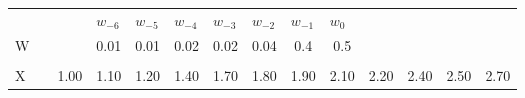 \begin{frame}
\begin{columns}
\begin{overlayarea}{\textwidth}{\textheight}
\begin{minipage}[t]{0.25\textwidth}
{\begin{table}[h]
{\begin{tabular}{p{0.1cm}p{0.1cm}p{0.1cm}p{0.1cm}p{0.1cm}p{0.1cm}p{0.1cm}p{0.1cm}p{0.1cm}p{0.1cm}p{0.1cm}p{0.1cm}p{0.1cm}p{0.1cm}}
								                     &                       &                           & $w_{-6}$                  & $w_{-5}$                  & $w_{-4}$                  & $w_{-3}$                  & $w_{-2}$                                         & $w_{-1}$                                         & $w_{0}$                                          &                                                  &                                                  &                                                  &                                                  \\ \cline{8-10}
								\cline{4-10}
								W                    &                       & \multicolumn{1}{c|}{}     & \multicolumn{1}{c|}{0.01} & \multicolumn{1}{c|}{0.01} & \multicolumn{1}{c|}{0.02} & \multicolumn{1}{c|}{0.02} & \multicolumn{1}{c|}{0.04}                        & \multicolumn{1}{c|}{0.4}                         & \multicolumn{1}{c|}{0.5}                         &                                                  &                                                  &                                                  &                                                  \\ \cline{4-10}
								\multicolumn{1}{l}{} &                       & \multicolumn{1}{l}{}      & \multicolumn{1}{l}{}      & \multicolumn{1}{l}{}      & \multicolumn{1}{l}{}      & \multicolumn{1}{l}{}      & \multicolumn{1}{l}{}                             & \multicolumn{1}{l}{}                             & \multicolumn{1}{l}{}                             &                                                  &                                                  &                                                  &                                                  \\ \cline{3-14} 
								X                    & \multicolumn{1}{l|}{} & \multicolumn{1}{c|}{1.00} & \multicolumn{1}{c|}{1.10} & \multicolumn{1}{c|}{1.20} & \multicolumn{1}{c|}{1.40} & \multicolumn{1}{c|}{1.70} & \multicolumn{1}{c|}{1.80}                        & \multicolumn{1}{c|}{1.90}                        & \multicolumn{1}{c|}{2.10}                        & \multicolumn{1}{c|}{2.20}                        & \multicolumn{1}{c|}{2.40}                        & \multicolumn{1}{c|}{2.50}                        & \multicolumn{1}{c|}{2.70}                        \\ \cline{3-14} 

\end{tabular}}
\end{table}}
\end{minipage}
\end{overlayarea}
\end{columns}
\end{frame}
